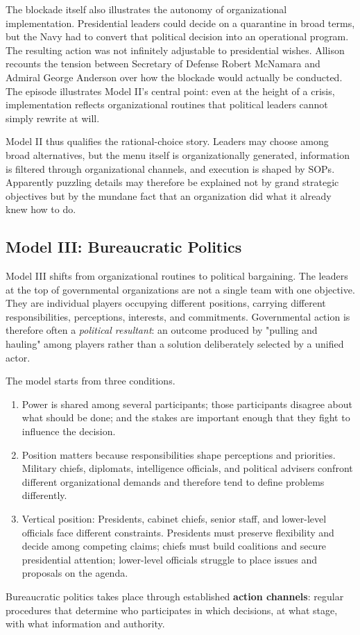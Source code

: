 The blockade itself also illustrates the autonomy of organizational implementation. Presidential leaders could decide on a quarantine in broad terms, but the Navy had to convert that political decision into an operational program. The resulting action was not infinitely adjustable to presidential wishes. Allison recounts the tension between Secretary of Defense Robert McNamara and Admiral George Anderson over how the blockade would actually be conducted. The episode illustrates Model II's central point: even at the height of a crisis, implementation reflects organizational routines that political leaders cannot simply rewrite at will.

Model II thus qualifies the rational-choice story. Leaders may choose among broad alternatives, but the menu itself is organizationally generated, information is filtered through organizational channels, and execution is shaped by SOPs. Apparently puzzling details may therefore be explained not by grand strategic objectives but by the mundane fact that an organization did what it already knew how to do.

\subsection{Model III: Bureaucratic Politics}

Model III shifts from organizational routines to political bargaining. The leaders at the top of governmental organizations are not a single team with one objective. They are individual players occupying different positions, carrying different responsibilities, perceptions, interests, and commitments. Governmental action is therefore often a \emph{political resultant}: an outcome produced by "pulling and hauling" among players rather than a solution deliberately selected by a unified actor.

The model starts from three conditions.

\begin{enumerate}
    \item Power is shared among several participants; those participants disagree about what should be done; and the stakes are important enough that they fight to influence the decision.

    \item Position matters because responsibilities shape perceptions and priorities. Military chiefs, diplomats, intelligence officials, and political advisers confront different organizational demands and therefore tend to define problems differently.

    \item Vertical position: Presidents, cabinet chiefs, senior staff, and lower-level officials face different constraints. Presidents must preserve flexibility and decide among competing claims; chiefs must build coalitions and secure presidential attention; lower-level officials struggle to place issues and proposals on the agenda.
\end{enumerate}
Bureaucratic politics takes place through established \textbf{action channels}: regular procedures that determine who participates in which decisions, at what stage, with what information and authority.

